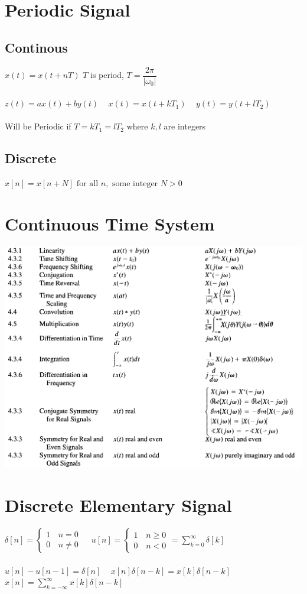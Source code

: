 \documentclass[]{article}
\begin{document}
\begin{multicols}{2}
    \section*{Periodic Signal}
    \subsection*{Continous}
    $x(t) = x(t+nT)$ $T$ is period, $T = \dfrac{2\pi}{|\omega_0|}$\\~\\
    $z(t) = ax(t) + by(t)$  ~ $ x(t) = x(t+ kT_1)$ ~ $y(t) = y(t + lT_2)$\\~\\
    Will be Periodic if $T = kT_1 = lT_2$ where $k, l$ are integers
    \subsection*{Discrete}
    $x[n] = x[n + N] \text{ for all } n,\text{ some integer } N > 0$

    \section*{Continuous Time System}
    \includegraphics[scale=0.3]{continuous1.png}\\
    \section*{Discrete Elementary Signal}
    $\delta[n] = \begin{cases}
            1\, & n = 0    \\
            0\, & n \neq 0
        \end{cases}$ ~
    $u[n] = \begin{cases}
            1\, & n \geq 0 \\
            0\, & n < 0
        \end{cases} = \sum\limits_{k = 0}^{\infty} \delta[k]
    $\\\\
    $u[n] - u[n - 1] = \delta[n]$ ~ $x[n]\delta[n-k] = x[k]\delta[n-k]$\\
    $x[n] = \sum\limits_{k=-\infty}^{\infty} x[k]\delta[n-k]$

\end{multicols}
\end{document}
